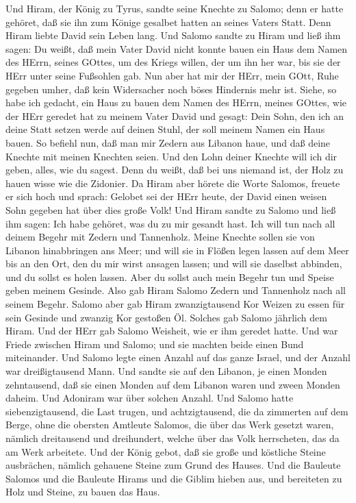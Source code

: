  Und Hiram, der König zu Tyrus, sandte seine Knechte zu
Salomo; denn er hatte gehöret, daß sie ihn zum Könige gesalbet hatten an
seines Vaters Statt. Denn Hiram liebte David sein Leben lang.
 Und Salomo sandte zu Hiram und ließ ihm sagen: 
Du weißt, daß mein Vater David nicht konnte bauen ein Haus dem Namen des
HErrn, seines GOttes, um des Kriegs willen, der um ihn her war, bis sie
der HErr unter seine Fußsohlen gab.  Nun aber hat mir der
HErr, mein GOtt, Ruhe gegeben umher, daß kein Widersacher noch böses
Hindernis mehr ist.  Siehe, so habe ich gedacht, ein Haus zu
bauen dem Namen des HErrn, meines GOttes, wie der HErr geredet hat zu
meinem Vater David und gesagt: Dein Sohn, den ich an deine Statt setzen
werde auf deinen Stuhl, der soll meinem Namen ein Haus bauen.
 So befiehl nun, daß man mir Zedern aus Libanon haue, und
daß deine Knechte mit meinen Knechten seien. Und den Lohn deiner Knechte
will ich dir geben, alles, wie du sagest. Denn du weißt, daß bei uns
niemand ist, der Holz zu hauen wisse wie die Zidonier.  Da
Hiram aber hörete die Worte Salomos, freuete er sich hoch und sprach:
Gelobet sei der HErr heute, der David einen weisen Sohn gegeben hat über
dies große Volk!  Und Hiram sandte zu Salomo und ließ ihm
sagen: Ich habe gehöret, was du zu mir gesandt hast. Ich will tun nach
all deinem Begehr mit Zedern und Tannenholz.  Meine Knechte
sollen sie von Libanon hinabbringen ans Meer; und will sie in Flößen
legen lassen auf dem Meer bis an den Ort, den du mir wirst ansagen
lassen; und will sie daselbst abbinden, und du sollst es holen lassen.
Aber du sollst auch mein Begehr tun und Speise geben meinem Gesinde.
 Also gab Hiram Salomo Zedern und Tannenholz nach all
seinem Begehr.  Salomo aber gab Hiram zwanzigtausend Kor
Weizen zu essen für sein Gesinde und zwanzig Kor gestoßen Öl. Solches
gab Salomo jährlich dem Hiram.  Und der HErr gab Salomo
Weisheit, wie er ihm geredet hatte. Und war Friede zwischen Hiram und
Salomo; und sie machten beide einen Bund miteinander.  Und
Salomo legte einen Anzahl auf das ganze Israel, und der Anzahl war
dreißigtausend Mann.  Und sandte sie auf den Libanon, je
einen Monden zehntausend, daß sie einen Monden auf dem Libanon waren und
zween Monden daheim. Und Adoniram war über solchen Anzahl. 
Und Salomo hatte siebenzigtausend, die Last trugen, und achtzigtausend,
die da zimmerten auf dem Berge,  ohne die obersten Amtleute
Salomos, die über das Werk gesetzt waren, nämlich dreitausend und
dreihundert, welche über das Volk herrscheten, das da am Werk arbeitete.
 Und der König gebot, daß sie große und köstliche Steine
ausbrächen, nämlich gehauene Steine zum Grund des Hauses. 
Und die Bauleute Salomos und die Bauleute Hirams und die Giblim hieben
aus, und bereiteten zu Holz und Steine, zu bauen das Haus.

